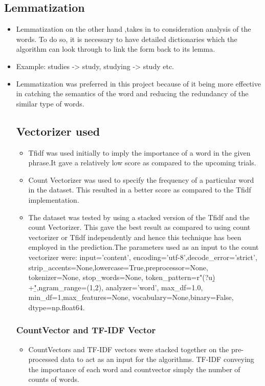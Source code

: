 \documentclass[12pt]{article}
\begin{document}
\subsection{Lemmatization}
\begin{itemize}
    \item Lemmatization on the other hand ,takes in to consideration analysis of the words. To do so, it is necessary to have detailed dictionaries which the algorithm can look through to link the form back to its lemma.
    \item Example: studies -> study, studying -> study etc.
    \item Lemmatization was preferred in this project because of it being more effective in catching the semantics of the word and reducing the redundancy of the similar type of words.

\subsection{Vectorizer used}
 \begin{itemize}
     \item Tfidf was used initially to imply the importance of a word in the given phrase.It gave a relatively low score as compared to the upcoming trials.
     \item Count Vectorizer was used to specify the frequency of a particular word in the dataset. This resulted in a better score as compared to the Tfidf implementation.
     \item The dataset was tested by using a stacked version of the Tfidf and the count Vectorizer. This gave the best result as compared to using count vectorizer or Tfidf independently and hence this technique has been employed in the prediction.The parameters used as an input to the count vectorizer were: input='content',
    encoding='utf-8',decode\_error='strict',
    strip\_accents=None,lowercase=True,preprocessor=None,
    tokenizer=None,
    stop\_words=None,
    token\_pattern=r"(?u)\b\w\w+\b",ngram\_range=(1,2),
    analyzer='word',
    max\_df=1.0,
    min\_df=1,max\_features=None,
    vocabulary=None,binary=False,
    dtype=np.float64.
 \end{itemize}

\subsubsection{CountVector and TF-IDF Vector}
\begin{itemize}
    \item CountVectors and TF-IDF vectors were stacked together on the pre-processed data to act as an input for the algorithms. TF-IDF conveying the importance of each word and countvector simply the number of counts of words.
\end{itemize}
\end{itemize}
\end{document}
